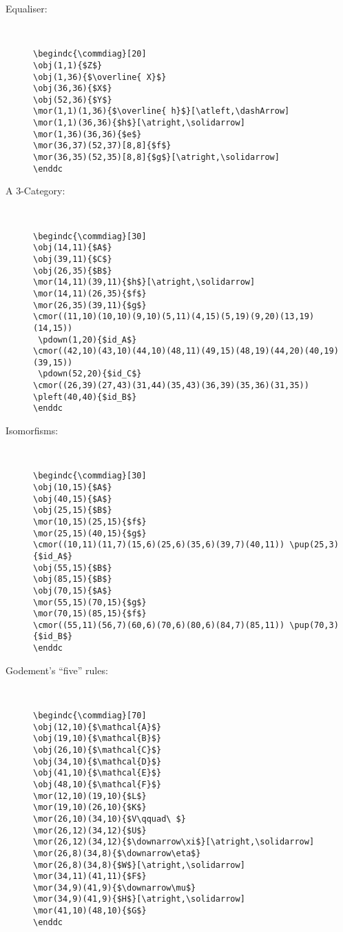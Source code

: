 \documentclass{europroc}
\begin{document}
\begin{description}
\item[Equaliser:] {\ }

{\footnotesize
\begin{verbatim}
\begindc{\commdiag}[20]
\obj(1,1){$Z$}
\obj(1,36){$\overline{ X}$}
\obj(36,36){$X$}
\obj(52,36){$Y$}
\mor(1,1)(1,36){$\overline{ h}$}[\atleft,\dashArrow]
\mor(1,1)(36,36){$h$}[\atright,\solidarrow]
\mor(1,36)(36,36){$e$}
\mor(36,37)(52,37)[8,8]{$f$}
\mor(36,35)(52,35)[8,8]{$g$}[\atright,\solidarrow]
\enddc
\end{verbatim}
}


\item[A 3-Category:] {\ }

{\footnotesize
\begin{verbatim}
\begindc{\commdiag}[30]
\obj(14,11){$A$}
\obj(39,11){$C$}
\obj(26,35){$B$}
\mor(14,11)(39,11){$h$}[\atright,\solidarrow]
\mor(14,11)(26,35){$f$}
\mor(26,35)(39,11){$g$}
\cmor((11,10)(10,10)(9,10)(5,11)(4,15)(5,19)(9,20)(13,19)(14,15))
 \pdown(1,20){$id_A$}
\cmor((42,10)(43,10)(44,10)(48,11)(49,15)(48,19)(44,20)(40,19)(39,15))
 \pdown(52,20){$id_C$}
\cmor((26,39)(27,43)(31,44)(35,43)(36,39)(35,36)(31,35)) \pleft(40,40){$id_B$}
\enddc
\end{verbatim}
}

\item[Isomorfisms:] {\ }

{\footnotesize
\begin{verbatim}
\begindc{\commdiag}[30]
\obj(10,15){$A$}
\obj(40,15){$A$}
\obj(25,15){$B$}
\mor(10,15)(25,15){$f$}
\mor(25,15)(40,15){$g$}
\cmor((10,11)(11,7)(15,6)(25,6)(35,6)(39,7)(40,11)) \pup(25,3){$id_A$}
\obj(55,15){$B$}
\obj(85,15){$B$}
\obj(70,15){$A$}
\mor(55,15)(70,15){$g$}
\mor(70,15)(85,15){$f$}
\cmor((55,11)(56,7)(60,6)(70,6)(80,6)(84,7)(85,11)) \pup(70,3){$id_B$}
\enddc
\end{verbatim}
}



\item[Godement's ``five'' rules:] {\ }

{\footnotesize
\begin{verbatim}
\begindc{\commdiag}[70]
\obj(12,10){$\mathcal{A}$}
\obj(19,10){$\mathcal{B}$}
\obj(26,10){$\mathcal{C}$}
\obj(34,10){$\mathcal{D}$}
\obj(41,10){$\mathcal{E}$}
\obj(48,10){$\mathcal{F}$}
\mor(12,10)(19,10){$L$}
\mor(19,10)(26,10){$K$}
\mor(26,10)(34,10){$V\qquad\ $}
\mor(26,12)(34,12){$U$}
\mor(26,12)(34,12){$\downarrow\xi$}[\atright,\solidarrow]
\mor(26,8)(34,8){$\downarrow\eta$}
\mor(26,8)(34,8){$W$}[\atright,\solidarrow]
\mor(34,11)(41,11){$F$}
\mor(34,9)(41,9){$\downarrow\mu$}
\mor(34,9)(41,9){$H$}[\atright,\solidarrow]
\mor(41,10)(48,10){$G$}
\enddc
\end{verbatim}
}


\end{description}
\end{document}
